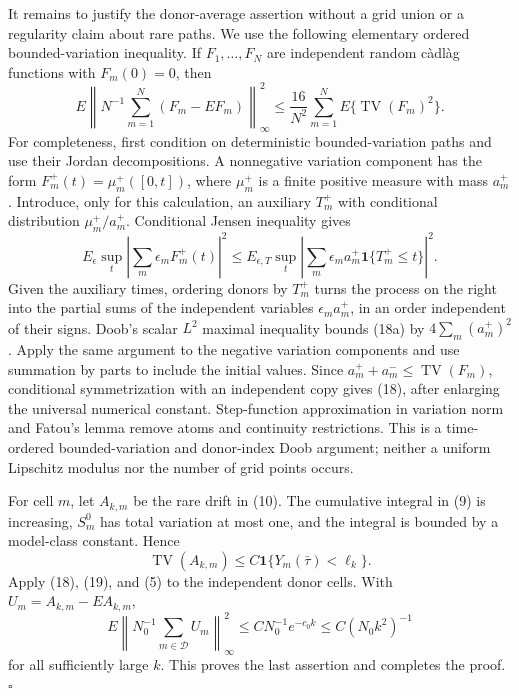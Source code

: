 It remains to justify the donor-average assertion without a grid union or a
regularity claim about rare paths.  We use the following elementary ordered
bounded-variation inequality.  If \(F_1,\ldots,F_N\) are independent random
c\`adl\`ag functions with \(F_m(0)=0\), then
\[
 E\left\|N^{-1}\sum_{m=1}^N(F_m-EF_m)\right\|_\infty^2
 \leq \frac{16}{N^2}\sum_{m=1}^NE\{\operatorname{TV}(F_m)^2\}. \tag{18}
\]
For completeness, first condition on deterministic bounded-variation paths and
use their Jordan decompositions.  A nonnegative variation component has the form
\(F_m^+(t)=\mu_m^+([0,t])\), where \(\mu_m^+\) is a finite positive measure
with mass \(a_m^+\).  Introduce, only for this calculation, an auxiliary
\(T_m^+\) with conditional distribution \(\mu_m^+/a_m^+\).  Conditional Jensen
inequality gives
\[
 E_\epsilon\sup_t\left|\sum_m\epsilon_mF_m^+(t)\right|^2
 \leq E_{\epsilon,T}\sup_t
 \left|\sum_m\epsilon_ma_m^+\mathbf1\{T_m^+\leq t\}\right|^2. \tag{18a}
\]
Given the auxiliary times, ordering donors by \(T_m^+\) turns the process on the
right into the partial sums of the independent variables
\(\epsilon_ma_m^+\), in an order independent of their signs.  Doob's scalar
\(L^2\) maximal inequality bounds (18a) by
\(4\sum_m(a_m^+)^2\).  Apply the same argument to the negative variation
components and use summation by parts to include the initial values.  Since
\(a_m^++a_m^-\leq\operatorname{TV}(F_m)\), conditional symmetrization with an
independent copy gives (18), after enlarging the universal numerical constant.
Step-function approximation in variation norm and Fatou's lemma remove atoms
and continuity restrictions.  This is a time-ordered bounded-variation and
donor-index Doob argument; neither a uniform Lipschitz modulus nor the number of
grid points occurs.

For cell \(m\), let \(A_{k,m}\) be the rare drift in (10).  The cumulative
integral in (9) is increasing, \(S_m^0\) has total variation at most one, and the
integral is bounded by a model-class constant.  Hence
\[
 \operatorname{TV}(A_{k,m})
 \leq C\mathbf 1\{Y_m(\bar\tau)<\ell_k\}.                 \tag{19}
\]
Apply (18), (19), and (5) to the independent donor cells.  With
\(U_m=A_{k,m}-EA_{k,m}\),
\[
 E\left\|N_0^{-1}\sum_{m\in\mathcal D}U_m\right\|_\infty^2
 \leq CN_0^{-1}e^{-c_0k}
 \leq C(N_0k^2)^{-1}                                      \tag{20}
\]
for all sufficiently large \(k\).  This proves the last assertion and completes
the proof. \(\square\)